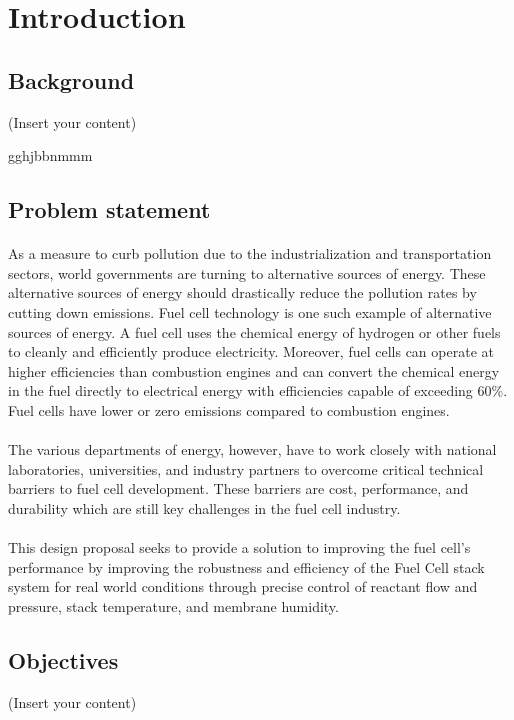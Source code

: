 \section{Introduction}
\label{sec:introduction}
\subsection{Background}
(Insert your content)

gghjbbnmmm

\subsection{Problem statement}
\paragraph{}As a measure to curb pollution due to the industrialization and transportation sectors, world governments are turning to alternative sources of energy. These alternative sources of energy should drastically reduce the pollution rates by cutting down emissions. Fuel cell technology is one such example of alternative sources of energy. A fuel cell uses the chemical energy of hydrogen or other fuels to cleanly and efficiently produce electricity. Moreover, fuel cells can operate at higher efficiencies than combustion engines and can convert the chemical energy in the fuel directly to electrical energy with efficiencies capable of exceeding 60\%. Fuel cells have lower or zero emissions compared to combustion engines.
\paragraph{}The various departments of energy, however,  have to work closely with national laboratories, universities, and industry partners to overcome critical technical barriers to fuel cell development. These barriers are cost, performance, and durability which are still key challenges in the fuel cell industry. 
\paragraph{}This design proposal seeks to provide a solution to improving the fuel cell’s performance by improving the robustness and efficiency of the Fuel Cell stack system for real world conditions through precise control of reactant flow and pressure, stack temperature, and membrane humidity.
\subsection{Objectives}
(Insert your content)

